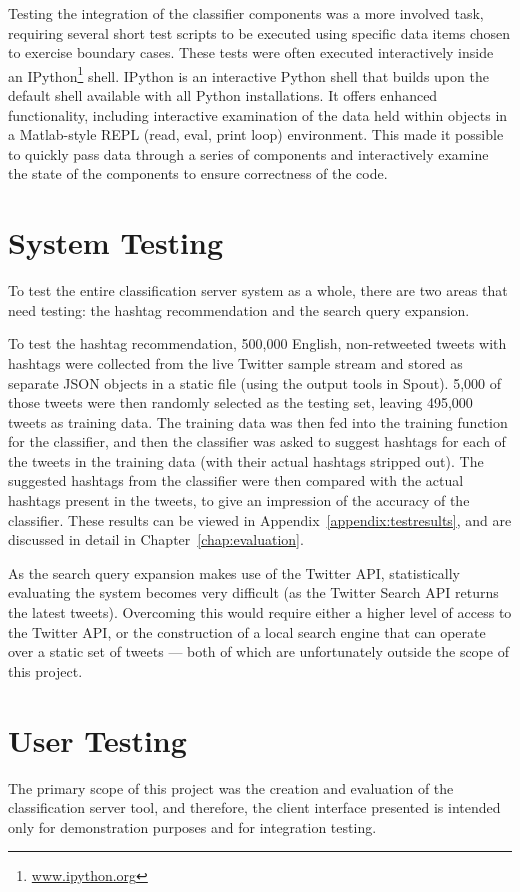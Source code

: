 \documentclass[11pt,a4paper]{report}
\begin{document}
Testing the integration of the classifier components was a more involved task, requiring several short test scripts to be executed using specific data items chosen to exercise boundary cases. These tests were often executed interactively inside an IPython\footnote{\url{www.ipython.org}} shell. IPython is an interactive Python shell that builds upon the default shell available with all Python installations. It offers enhanced functionality, including interactive examination of the data held within objects in a Matlab-style REPL (read, eval, print loop) environment. This made it possible to quickly pass data through a series of components and interactively examine the state of the components to ensure correctness of the code.

\section{System Testing}
\label{sec:systemtesting}
To test the entire classification server system as a whole, there are two areas that need testing: the hashtag recommendation and the search query expansion.

To test the hashtag recommendation, 500,000 English, non-retweeted tweets with hashtags were collected from the live Twitter sample stream and stored as separate JSON objects in a static file (using the output tools in Spout). 5,000 of those tweets were then randomly selected as the testing set, leaving 495,000 tweets as training data. The training data was then fed into the training function for the classifier, and then the classifier was asked to suggest hashtags for each of the tweets in the training data (with their actual hashtags stripped out). The suggested hashtags from the classifier were then compared with the actual hashtags present in the tweets, to give an impression of the accuracy of the classifier. These results can be viewed in Appendix~\ref{appendix:testresults}, and are discussed in detail in Chapter~\ref{chap:evaluation}.

As the search query expansion makes use of the Twitter API, statistically evaluating the system becomes very difficult (as the Twitter Search API returns the latest tweets). Overcoming this would require either a higher level of access to the Twitter API, or the construction of a local search engine that can operate over a static set of tweets --- both of which are unfortunately outside the scope of this project.

\section{User Testing}
The primary scope of this project was the creation and evaluation of the classification server tool, and therefore, the client interface presented is intended only for demonstration purposes and for integration testing.
\end{document}
